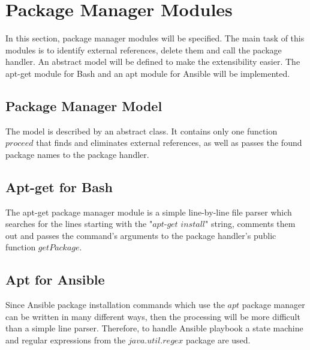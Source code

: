 \section{Package Manager Modules}
In this section, package manager modules will be specified.
The main task of this modules is to identify external references, delete them and call the package handler.
An abstract model will be defined to make the extensibility easier.
The apt-get module for Bash and an apt module for Ansible will be implemented.
\subsection*{Package Manager Model}
The model is described by an abstract class.
It contains only one function $proceed$ that finds and eliminates external references, as well as passes the found package names to the package handler.
%	
%	
%	
%	
\subsection*{Apt-get for Bash}
The apt-get package manager module is a simple line-by-line file parser which searches for the lines starting with the "$apt$-$get$ $install$" string, comments them out and passes the command's arguments to the package handler's public function $getPackage$. 
\subsection*{Apt for Ansible}
Since Ansible package installation commands which use the $apt$ package manager can be written in many different ways, then the processing will be more difficult than a simple line parser.
Therefore, to handle Ansible playbook a state machine and regular expressions from the $java$.$util$.$regex$ package are used.

